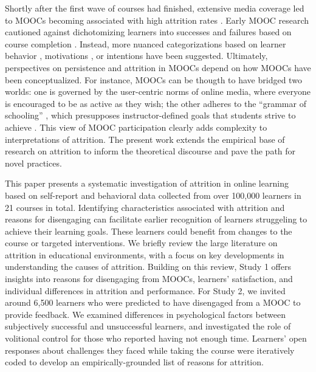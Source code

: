 \documentclass{sigchi}\usepackage[]{graphicx}\usepackage[]{color}
\begin{document}
Shortly after the first wave of courses had finished, extensive media coverage led to MOOCs becoming associated with high attrition rates \cite{lewin2013after,parr2013mooc}. Early MOOC research cautioned against dichotomizing learners into successes and failures based on course completion \cite{kizilcec2013deconstructing,rivard2013measuring}. Instead, more nuanced categorizations based on learner behavior \cite{kizilcec2013deconstructing,clow2013moocs}, motivations \cite{kizilcec2015motivation}, or intentions \cite{wilkowski2014student} have been suggested. Ultimately, perspectives on persistence and attrition in MOOCs depend on how MOOCs have been conceptualized. For instance, MOOCs can be thougth to have bridged two worlds: one is governed by the user-centric norms of online media, where everyone is encouraged to be as active as they wish; the other adheres to the ``grammar of schooling'' \cite{tyack1994grammar}, which presupposes instructor-defined goals that students strive to achieve \cite{kizilcec2015motivation}. This view of MOOC participation clearly adds complexity to interpretations of attrition. The present work extends the empirical base of research on attrition to inform the theoretical discourse and pave the path for novel practices.

This paper presents a systematic investigation of attrition in online learning based on self-report and behavioral data collected from over 100,000 learners in 21 courses in total. Identifying characteristics associated with attrition and reasons for disengaging can facilitate earlier recognition of learners struggeling to achieve their learning goals. These learners could benefit from changes to the course or targeted interventions. We briefly review the large literature on attrition in educational environments, with a focus on key developments in understanding the causes of attrition. Building on this review, Study 1 offers insights into reasons for disengaging from MOOCs, learners' satisfaction, and individual differences in attrition and performance. For Study 2, we invited around 6,500 learners who were predicted to have disengaged from a MOOC to provide feedback. We examined differences in psychological factors between subjectively successful and unsuccessful learners, and investigated the role of volitional control for those who reported having not enough time. Learners' open responses about challenges they faced while taking the course were iteratively coded to develop an empirically-grounded list of reasons for attrition.
\end{document}
